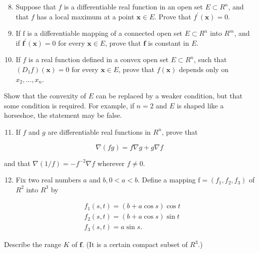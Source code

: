 \documentclass[10pt]{article}
\begin{document}
\begin{enumerate}
  \setcounter{enumi}{7}
  \item Suppose that $f$ is a differentiable real function in an open set $E \subset R^{n}$, and that $f$ has a local maximum at a point $\mathbf{x} \in E$. Prove that $f^{\prime}(\mathbf{x})=0$.

  \item If $\mathrm{f}$ is a differentiable mapping of a connected open set $E \subset R^{n}$ into $R^{m}$, and if $\mathbf{f}^{\prime}(\mathbf{x})=0$ for every $\mathbf{x} \in E$, prove that $\mathbf{f}$ is constant in $E$.

  \item If $f$ is a real function defined in a convex open set $E \subset R^{n}$, such that $\left(D_{1} f\right)(\mathbf{x})=0$ for every $\mathbf{x} \in E$, prove that $f(\mathbf{x})$ depends only on $x_{2}, \ldots, x_{n}$.

\end{enumerate}

Show that the convexity of $E$ can be replaced by a weaker condition, but that some condition is required. For example, if $n=2$ and $E$ is shaped like a horseshoe, the statement may be false.

\begin{enumerate}
  \setcounter{enumi}{10}
  \item If $f$ and $g$ are differentiable real functions in $R^{n}$, prove that
\end{enumerate}

$$
\nabla(f g)=f \nabla g+g \nabla f
$$

and that $\nabla(1 / f)=-f^{-2} \nabla f$ wherever $f \neq 0$.

\begin{enumerate}
  \setcounter{enumi}{11}
  \item Fix two real numbers $a$ and $b, 0<a<b$. Define a mapping $\mathrm{f}=\left(f_{1}, f_{2}, f_{3}\right)$ of $R^{2}$ into $R^{3}$ by
\end{enumerate}

$$
\begin{aligned}
& f_{1}(s, t)=(b+a \cos s) \cos t \\
& f_{2}(s, t)=(b+a \cos s) \sin t \\
& f_{3}(s, t)=a \sin s .
\end{aligned}
$$

Describe the range $K$ of $\mathbf{f}$. (It is a certain compact subset of $R^{3}$.)
\end{document}
